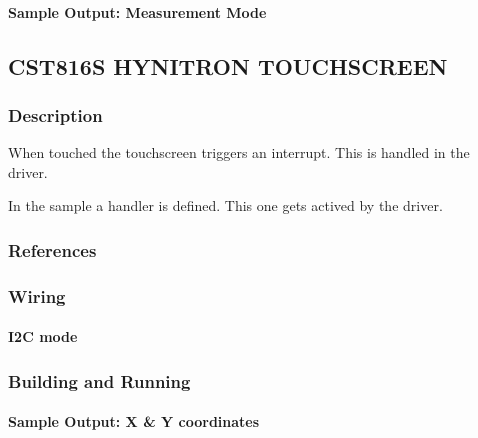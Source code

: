\documentclass[letterpaper,10pt,english]{sphinxmanual}
\begin{document}
\paragraph{Sample Output: Measurement Mode}
\label{\detokenize{samples/sensor/bma280/README:sample-output-measurement-mode}}

\subsection{CST816S HYNITRON TOUCHSCREEN}
\label{\detokenize{samples/sensor/cst816s/README:cst816s-hynitron-touchscreen}}\label{\detokenize{samples/sensor/cst816s/README:cst816s}}\label{\detokenize{samples/sensor/cst816s/README::doc}}

\subsubsection{Description}
\label{\detokenize{samples/sensor/cst816s/README:description}}
When touched the touchscreen triggers an interrupt.
This is handled in the driver.

In the sample a handler is defined.
This one gets actived by the driver.


\subsubsection{References}
\label{\detokenize{samples/sensor/cst816s/README:references}}

\subsubsection{Wiring}
\label{\detokenize{samples/sensor/cst816s/README:wiring}}

\paragraph{I2C mode}
\label{\detokenize{samples/sensor/cst816s/README:i2c-mode}}

\subsubsection{Building and Running}
\label{\detokenize{samples/sensor/cst816s/README:building-and-running}}

\paragraph{Sample Output: X \& Y coordinates}
\label{\detokenize{samples/sensor/cst816s/README:sample-output-x-y-coordinates}}
\end{document}
